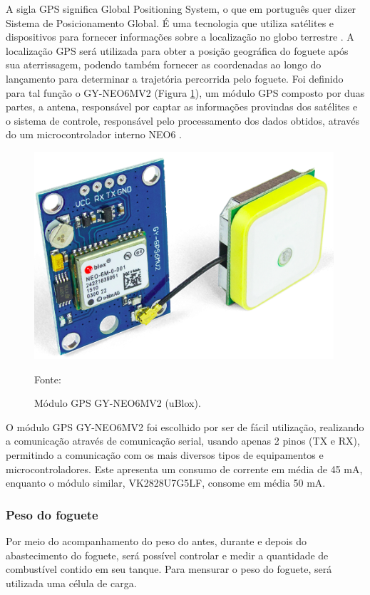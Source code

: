 A sigla GPS significa Global Positioning System, o que em português quer dizer Sistema de Posicionamento Global. É uma tecnologia que utiliza satélites e dispositivos para fornecer informações sobre a localização no globo terrestre \cite{fisica_GPS_2020}.
A localização GPS será utilizada para obter a posição geográfica do foguete após sua aterrissagem, podendo também fornecer as coordenadas ao longo do lançamento para determinar a trajetória percorrida pelo foguete.
Foi definido para tal função o GY-NEO6MV2 (Figura \ref{fig:moduloGPS}), um módulo GPS composto por duas partes, a antena, responsável por captar as informações provindas dos satélites e o sistema de controle, responsável pelo processamento dos dados obtidos, através do um microcontrolador interno NEO6 \cite{datasheet_GPS}.

\begin{figure}[H]
  \centering
  \includegraphics[scale=0.75]{figuras/moduloGPS.png}
  \caption{Módulo GPS GY-NEO6MV2 (uBlox). }
  {\footnotesize Fonte: \cite{figura_GPS}}
  \label{fig:moduloGPS}
\end{figure}

O módulo GPS GY-NEO6MV2 foi escolhido por ser de fácil utilização, realizando a comunicação através de comunicação serial, usando apenas 2 pinos (TX e RX), permitindo a comunicação com os mais diversos tipos de equipamentos e microcontroladores. Este apresenta um consumo de corrente em média de 45 mA, enquanto o módulo similar, VK2828U7G5LF, consome em média 50 mA.

\subsubsection{Peso do foguete}

Por meio do acompanhamento do peso do antes, durante e depois do abastecimento do foguete, será possível controlar e medir a quantidade de combustível contido em seu tanque. Para mensurar o peso do foguete, será utilizada uma célula de carga. 

